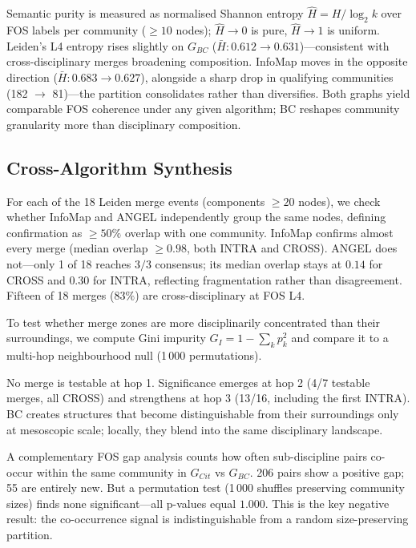 Semantic purity is measured as normalised Shannon entropy $\hat{H} = H / \log_2 k$ over FOS labels per community ($\geq 10$ nodes); $\hat{H} \to 0$ is pure, $\hat{H} \to 1$ is uniform.  Leiden's L4 entropy rises slightly on $G_{BC}$ ($\bar{H}: 0.612 \to 0.631$)---consistent with cross-disciplinary merges broadening composition. InfoMap moves in the opposite direction ($\bar{H}: 0.683 \to 0.627$), alongside a sharp drop in qualifying communities (182 $\to$ 81)---the partition consolidates rather than diversifies.  Both graphs yield comparable FOS coherence under any given algorithm; BC reshapes community granularity more than disciplinary composition.

\subsection{Cross-Algorithm Synthesis}
\label{subsec:cd:synthesis}

For each of the 18 Leiden merge events (components $\geq 20$ nodes), we check whether InfoMap and ANGEL independently group the same nodes, defining confirmation as $\geq 50\%$ overlap with one community. InfoMap confirms almost every merge (median overlap $\geq 0.98$, both INTRA and CROSS).  ANGEL does not---only 1 of 18 reaches $3/3$ consensus; its median overlap stays at $0.14$ for CROSS and $0.30$ for INTRA, reflecting fragmentation rather than disagreement.  Fifteen of 18 merges ($83\%$) are cross-disciplinary at FOS L4.

To test whether merge zones are more disciplinarily concentrated than their surroundings, we compute Gini impurity $G_I = 1 - \sum_k p_k^2$ and compare it to a multi-hop neighbourhood null (1\,000 permutations).

No merge is testable at hop 1.  Significance emerges at hop 2 (4/7 testable merges, all CROSS) and strengthens at hop 3 (13/16, including the first INTRA).  BC creates structures that become distinguishable from their surroundings only at mesoscopic scale; locally, they blend into the same disciplinary landscape.

A complementary FOS gap analysis counts how often sub-discipline pairs co-occur within the same community in $G_{Cit}$ vs $G_{BC}$.  206 pairs show a positive gap; 55 are entirely new.  But a permutation test (1\,000 shuffles preserving community sizes) finds none significant---all p-values equal $1.000$.
This is the key negative result: the co-occurrence signal is indistinguishable from a random size-preserving partition.


